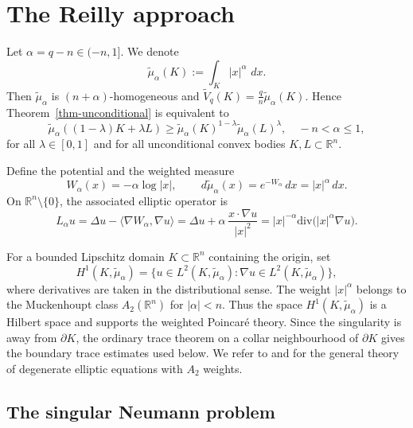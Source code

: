 \documentclass[12pt,leqno]{amsart}
\theoremstyle{plain} \newtheorem{thm}{Theorem}[section]
\theoremstyle{plain} \newtheorem{prop}[thm]{Proposition}
\theoremstyle{plain} \newtheorem{prob}[thm]{Problem}
\theoremstyle{definition} \newtheorem{defi}[thm]{Definition}
\theoremstyle{plain} \newtheorem{cor}[thm]{Corollary}
\theoremstyle{plain} \newtheorem{lem}[thm]{Lemma}
\theoremstyle{plain} \newtheorem{eg}{Example}[section]
\theoremstyle{remark} \newtheorem{rmk}[thm]{Remark}
\theoremstyle{plain} \newtheorem{conj}{Conjecture}
\numberwithin{equation}{section}
\newcommand{\bR}{\mathbb{R}}
\newcommand{\divg}{\mathrm{div}}
\newcommand{\tV}{\widetilde V}
\newcommand{\dd}{\,d}
\newcommand{\R}{\mathbb{R}}
\begin{document}
\section{The Reilly approach}
\label{sec-unconditional-prep}

Let $\alpha=q-n \in (-n,1]$. We denote
\[
  \tilde{\mu}_\alpha(K):=\int_K |x|^\alpha\,\dd x .
\]
Then $\tilde{\mu}_\alpha$ is $(n+\alpha)$-homogeneous and $\tV_q(K)=\frac qn\tilde{\mu}_\alpha(K)$. 
Hence Theorem~\ref{thm-unconditional} is equivalent to
\begin{equation}\label{tilde-mu-alpha-BM}
  \tilde{\mu}_\alpha((1-\lambda) K+\lambda L)
  \geq
  \tilde{\mu}_\alpha(K)^{1-\lambda} \tilde{\mu}_\alpha(L)^{\lambda},\quad -n<\alpha\le 1,
\end{equation}
for all $\lambda\in[0,1]$ and for all unconditional convex bodies $K,L\subset\bR^{n}$.

Define the potential and the weighted measure
\[
  W_\alpha(x)=-\alpha\log|x|,
  \qquad
  \dd\tilde{\mu}_\alpha(x)=e^{-W_\alpha}\dd x=|x|^\alpha\dd x .
\]
On $\R^n\setminus\{0\}$, the associated elliptic operator is
\[
  L_\alpha u
  =\Delta u-\langle\nabla W_\alpha,\nabla u\rangle
  =\Delta u+\alpha\,\frac{x\cdot\nabla u}{|x|^2}
  =|x|^{-\alpha}\divg\!\bigl(|x|^\alpha\nabla u\bigr).
\]

For a bounded Lipschitz domain $K\subset\R^n$ containing the origin, set
\[
  H^1(K,\tilde{\mu}_\alpha)
  =
  \bigl\{u\in L^2(K,\tilde{\mu}_\alpha):
  \nabla u\in L^2(K,\tilde{\mu}_\alpha)\bigr\},
\]
where derivatives are taken in the distributional sense. The weight
$|x|^\alpha$ belongs to the Muckenhoupt class $A_2(\R^n)$ for
$|\alpha|<n$. Thus the space $H^1(K,\tilde{\mu}_\alpha)$ is a Hilbert
space and supports the weighted Poincar\'e theory. Since the
singularity is away from $\partial K$, the ordinary trace theorem on a
collar neighbourhood of $\partial K$ gives the boundary trace estimates
used below. We refer to \cite{FKS82} and \cite{HKM06} for the general
theory of degenerate elliptic equations with $A_2$ weights.

\subsection{The singular Neumann problem}
\label{sec-singular-neumann}
\end{document}
